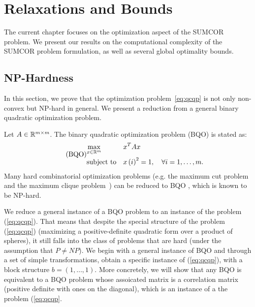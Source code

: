 %
\chapter{Relaxations and Bounds}\label{chap:relaxations}
The current chapter focuses on the optimization aspect of the SUMCOR problem.
We present our results on the computational complexity of the
SUMCOR problem formulation, as well as several global optimality bounds.

\section{NP-Hardness}\label{chap:relaxations:nphard}
In this section, we prove that the optimization problem~\ref{eq:qcqp} is not only
non-convex but NP-hard in general. We present a reduction from a general binary quadratic
optimization problem.

Let $A \in \mathbb{R}^{m\times m}$.
The binary quadratic optimization problem (BQO) is stated as:
\begin{equation}\label{eq:binqp}
\tag{BQO}
\begin{aligned}
& \underset{x \in \mathbb{R}^m}{\text{max}}
& & x^T A x  \\
& \text{subject to}
& & x\left(i\right)^2 = 1, \quad\forall i =1,\ldots,m.\\
\end{aligned}
\end{equation}
Many hard combinatorial optimization problems (e.g. the
maximum cut  problem and the maximum clique problem~\cite{Garey:1990:CIG:574848})
can be reduced to BQO \cite{Goemans95improvedapproximation}, which is known to be NP-hard.

We reduce a general instance of a  BQO problem to an
instance of the problem (\ref{eq:qcqp}). That means that despite the special
structure of the problem (\ref{eq:qcqp}) (maximizing a positive-definite quadratic
form over a product of spheres), it still falls into the class of problems that
are hard (under the assumption that $P \neq NP$).
We begin with a general instance of BQO and through a set of simple transformations, obtain a specific
instance of (\ref{eq:qcqp}), with a block structure $b = \left(1,\ldots,1\right)$.
More concretely, we will show that any BQO is equivalent to a BQO problem whose assoicated
matrix is a correlation matrix (positive definite with ones on the diagonal), which is an
instance of a the problem (\ref{eq:qcqp}.

